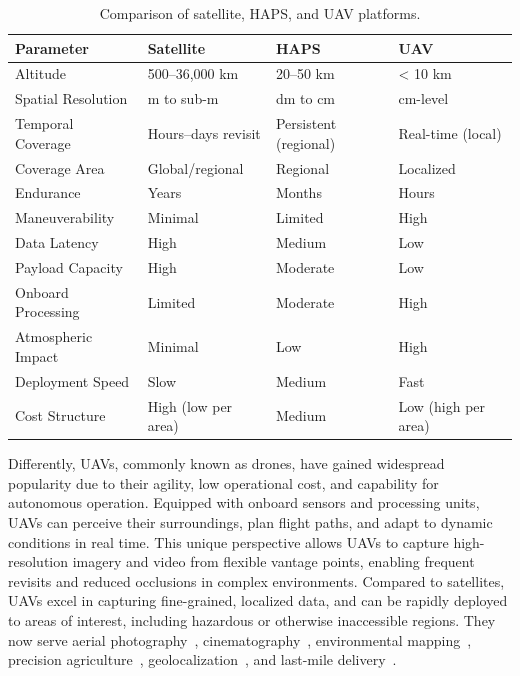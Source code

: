 \begin{table}[!ht]
\centering
\caption{Comparison of satellite, HAPS, and UAV platforms.} 
\label{tab:air-agents}
\small
\setlength{\tabcolsep}{2.5mm}
\begin{tabular}{@{}llll@{}}
\toprule
\textbf{Parameter} & \textbf{Satellite} & \textbf{HAPS} & \textbf{UAV} \\
\midrule
Altitude & 500--36,000 km & 20--50 km & < 10 km \\
Spatial Resolution & m to sub-m & dm to cm & cm-level \\
Temporal Coverage & Hours--days revisit & Persistent (regional) & Real-time (local) \\
Coverage Area & Global/regional & Regional & Localized \\
Endurance & Years & Months & Hours \\
Maneuverability & Minimal & Limited & High \\
Data Latency & High & Medium & Low \\
Payload Capacity & High & Moderate & Low \\
Onboard Processing & Limited & Moderate & High \\
Atmospheric Impact & Minimal & Low & High \\
Deployment Speed & Slow & Medium & Fast \\
Cost Structure & High (low per area) & Medium & Low (high per area) \\
\bottomrule
\end{tabular}
\end{table}


Differently, UAVs, commonly known as drones, have gained widespread popularity due to their agility, low operational cost, and capability for autonomous operation. Equipped with onboard sensors and processing units, UAVs can perceive their surroundings, plan flight paths, and adapt to dynamic conditions in real time. This unique perspective allows UAVs to capture high-resolution imagery and video from flexible vantage points, enabling frequent revisits and reduced occlusions in complex environments. Compared to satellites, UAVs excel in capturing fine-grained, localized data, and can be rapidly deployed to areas of interest, including hazardous or otherwise inaccessible regions. They now serve aerial photography~\cite{zhao2023ms,shao2022efficient}, cinematography~\cite{pitas2022autonomous,dang2022path}, environmental mapping~\cite{zheng2020university,wang2021each,lin2022joint}, precision agriculture~\cite{goodrich2023placement}, geolocalization~\cite{liu2019lending,shi2019spatial,shi2020optimal,shi2020looking,shi2022beyond,shi2022accurate,shi2022cvlnet,shi2023boosting,song2023learning}, and last-mile delivery~\cite{sorbelli2023wind,dissanayaka2023review}.

